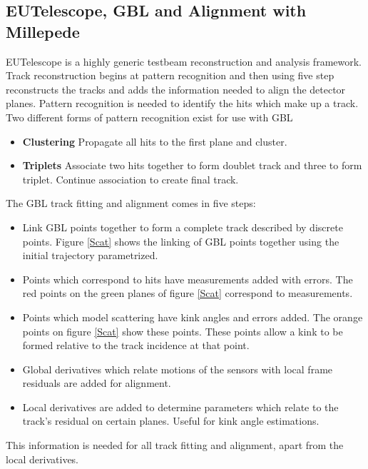\documentclass[a0,portrait]{a0poster}
\begin{document}
\begin{multicols}{2}
\begin{tcolorbox}
\subsection*{EUTelescope, GBL and Alignment with Millepede}
EUTelescope is a highly generic testbeam reconstruction and analysis framework\cite{eutel}. Track reconstruction begins at pattern recognition and then using five step reconstructs the tracks and adds the information needed to align the detector planes. 
Pattern recognition is needed to identify the hits which make up a track. Two different forms of pattern recognition exist for use with GBL
\begin{itemize}
\item \textbf{Clustering} Propagate all hits to the first plane and cluster. 
\item \textbf{Triplets} Associate two hits together to form doublet track and three to form triplet. Continue association to create final track.
\end{itemize}

The GBL track fitting and alignment comes in five steps:
\begin{itemize}
\item Link GBL points together to form a complete track described by discrete points. Figure \ref{Scat} shows the linking of GBL points together using the initial trajectory parametrized.
\item Points which correspond to hits have measurements added with errors. The red points on the green planes of figure \ref{Scat} correspond to measurements.
\item Points which model scattering have kink angles and errors added. The orange points on figure \ref{Scat} show these points. These points allow a kink to be formed relative to the track incidence at that point.
\item Global derivatives which relate motions of the sensors with local frame residuals are added for alignment.
\item Local derivatives are added to determine parameters which relate to the track's residual on certain planes. Useful for kink angle estimations.
\end{itemize}

This information is needed for all track fitting and alignment, apart from the local derivatives.


\end{tcolorbox}
\end{multicols}
\end{document}
